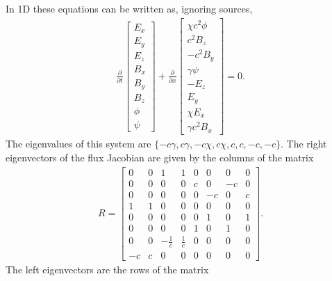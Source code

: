 \documentclass[11pt, reqno]{amsart}
\newcommand{\pfraca}[1]{\frac{\partial}{\partial #1}}
\theoremstyle{definition}
\begin{document}
In 1D these equations can be written as, ignoring sources,
\begin{align}
  \pfraca{t}
  \left[
    \begin{matrix}
      E_x \\
      E_y \\
      E_z \\
      B_x \\
      B_y \\
      B_z \\
      \phi \\
      \psi
    \end{matrix}
  \right]
  +
  \pfraca{x}
  \left[
    \begin{matrix}
      \chi c^2 \phi \\
      c^2B_z \\
      -c^2B_y \\
      \gamma \psi \\
      -E_z \\
      E_y \\
      \chi E_x \\
      \gamma c^2B_x
    \end{matrix}
  \right]
  =
  0.
\end{align}
The eigenvalues of this system are $\{-c\gamma, c\gamma, -c\chi,
c\chi, c, c, -c, -c\}$. The right eigenvectors of the flux Jacobian
are given by the columns of the matrix
\begin{align}
  R
  =
  \left[
    \begin{matrix}
      0  & 0 & 1 & 1 & 0 &  0 &  0 & 0 \\
      0  & 0 & 0 & 0 & c &  0 & -c & 0 \\
      0  & 0 & 0 & 0 & 0 & -c &  0 & c \\
      1  & 1 & 0 & 0 & 0 &  0 &  0 & 0 \\
      0  & 0 & 0 & 0 & 0 &  1 &  0 & 1 \\
      0  & 0 & 0 & 0 & 1 &  0 &  1 & 0 \\
      0  & 0 & -\frac{1}{c} & \frac{1}{c} & 0 &  0 &  0 & 0 \\
     -c  & c & 0 & 0 & 0 &  0 &  0 & 0
    \end{matrix}
  \right].
  \label{eq:ph_rev}
\end{align}
The left eigenvectors are the rows of the matrix
\end{document}
